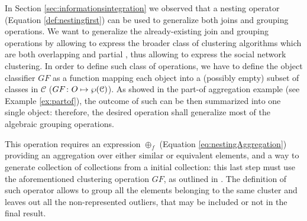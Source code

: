 In Section \vref{sec:informationsintegration} we observed that a nesting operator (Equation \vref{def:nestingfirst}) can be used to generalize both joins and grouping operations. We want to generalize the already-existing join and grouping operations by allowing to express the broader class of clustering algorithms which are both overlapping and partial \cite{Tan05}, thus allowing to express the social network clustering. In order to define such class of operations, we have to define the object classifier  $GF$ as a function mapping each object into a (possibly empty) subset of classes in $\mathcal{C}$ ($GF\colon O\mapsto \wp(\mathcal{C})$). As showed in the part-of aggregation example (see Example \vref{ex:partof}), the outcome of such  can be then summarized into one single object: therefore, the desired operation shall generalize most of the algebraic grouping operations.


This operation requires an expression $\oplus_f$ (Equation \vref{eq:nestingAggregation}) providing  an aggregation over either similar or equivalent elements, and a way to generate collection of collections from a initial collection: this last step must use the aforementioned clustering operation $GF$, as outlined in \cite{Magnani06}. The definition of such  operator allows to group all the elements belonging to the same cluster and leaves out all the non-represented outliers, that may be included or not in the final result. 
\medskip


